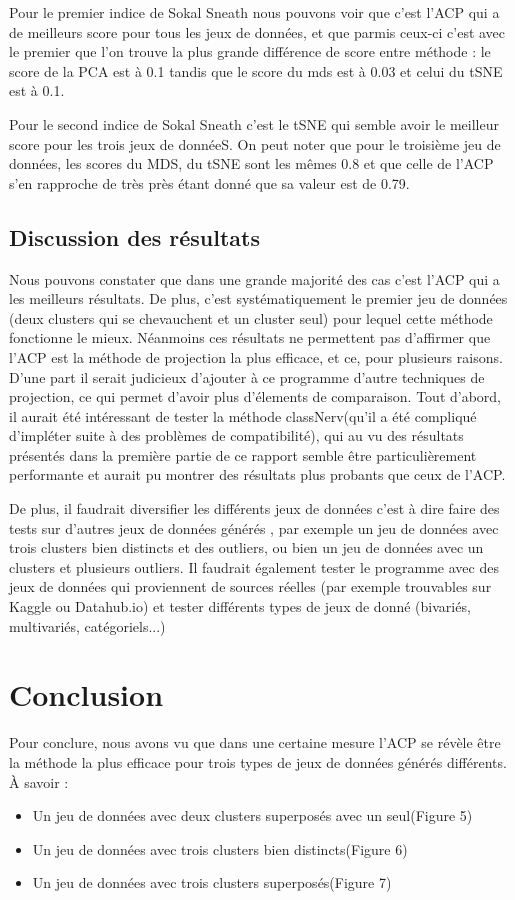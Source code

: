Pour le premier indice de Sokal Sneath nous pouvons voir que c'est l'ACP qui a de meilleurs score pour tous les jeux de données, et que parmis ceux-ci
c'est avec le premier que l'on trouve la plus grande différence de score entre méthode : le score de la PCA est à 0.1 tandis que le score du mds est à 0.03 et celui du tSNE est à 0.1.

Pour le second indice de Sokal Sneath c'est le tSNE qui semble avoir le meilleur score pour les trois jeux de donnéeS.
On peut noter que pour le troisième jeu de données, les scores du MDS, du tSNE sont les mêmes 0.8 et que celle de l'ACP s'en rapproche de très près étant donné que sa valeur est de 0.79.

\subsection{Discussion des résultats}
Nous pouvons constater que dans une grande majorité des cas c'est l'ACP qui a les meilleurs résultats. De plus, c'est systématiquement le premier jeu de données
(deux clusters qui se chevauchent et un cluster seul) pour lequel cette méthode fonctionne le mieux.
Néanmoins ces résultats ne permettent pas d'affirmer que l'ACP est la méthode de projection la plus efficace, et ce, pour plusieurs raisons.
D'une part il serait judicieux d'ajouter à ce programme d'autre techniques de projection, ce qui permet d'avoir plus d'élements de comparaison.
Tout d'abord, il aurait été intéressant de tester la méthode classNerv(qu'il a été compliqué d'impléter suite à des problèmes de compatibilité), qui au vu des résultats présentés dans la première partie de ce rapport
semble être particulièrement performante et aurait pu montrer des résultats plus probants que ceux de l'ACP. 

De plus, il faudrait diversifier les différents jeux de données c'est à dire faire des tests sur d'autres jeux de données générés , par exemple
un jeu de données avec trois clusters bien distincts et des outliers, ou bien un jeu de données avec un clusters et plusieurs outliers.
Il faudrait également tester le programme avec des jeux de données qui proviennent de sources réelles (par exemple trouvables sur Kaggle ou Datahub.io) et tester différents types
de jeux de donné (bivariés, multivariés, catégoriels...)


\section{Conclusion}
Pour conclure, nous avons vu que dans une certaine mesure l'ACP se révèle être la méthode la plus efficace pour trois types de jeux de données générés différents. À savoir :
\begin{itemize}
    \item Un jeu de données avec deux clusters superposés avec un seul(Figure 5)
    \item Un jeu de données avec trois clusters bien distincts(Figure 6)
    \item Un jeu de données avec trois clusters superposés(Figure 7)
\end{itemize}

